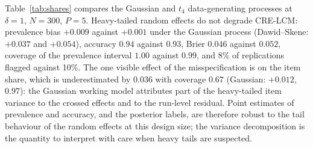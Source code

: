 Table~\ref{tab:shares} compares the Gaussian and $t_4$ data-generating processes at
$\delta = 1$, $N = 300$, $P = 5$. Heavy-tailed random effects do not degrade CRE-LCM:
prevalence bias $+0.009$ against $+0.001$ under the Gaussian process (Dawid--Skene:
$+0.037$ and $+0.054$), accuracy $0.94$ against $0.93$, Brier $0.046$ against $0.052$,
coverage of the prevalence interval $1.00$ against $0.99$, and 8\% of replications
flagged against 10\%. The one visible effect of the misspecification is on the item
share, which is underestimated by $0.036$ with coverage $0.67$ (Gaussian: $+0.012$,
$0.97$): the Gaussian working model attributes part of the heavy-tailed item variance
to the crossed effects and to the run-level residual. Point estimates of prevalence and
accuracy, and the posterior labels, are therefore robust to the tail behaviour of the
random effects at this design size; the variance decomposition is the quantity to
interpret with care when heavy tails are suspected.

